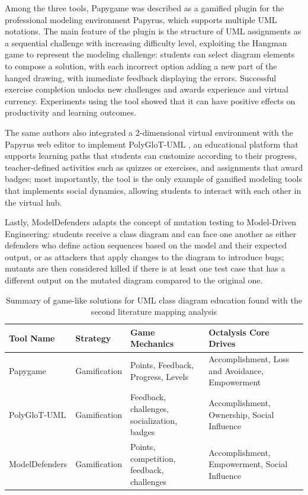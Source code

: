 {Among the three tools, Papygame \cite{bucchiarone2020papyrus, bucchiarone2023gamifying} was described as a gamified plugin for the professional modeling environment Papyrus, which supports multiple UML notations. The main feature of the plugin is the structure of UML assignments as a sequential challenge with increasing difficulty level, exploiting the Hangman game to represent the modeling challenge: students can select diagram elements to compose a solution, with each incorrect option adding a new part of the hanged drawing, with immediate feedback displaying the errors. Successful exercise completion unlocks new challenges and awards experience and virtual currency. Experiments using the tool showed that it can have positive effects on productivity and learning outcomes.

The same authors also integrated a 2-dimensional virtual environment with the Papyrus web editor to implement PolyGloT-UML \cite{bucchiarone2024polyglot}, an educational platform that supports learning paths that students can customize according to their progress, teacher-defined activities such as quizzes or exercises, and assignments that award badges; most importantly, the tool is the only example of gamified modeling tools that implements social dynamics, allowing students to interact with each other in the virtual hub. 

Lastly, ModelDefenders \cite{cammaerts2023modeldefenders, cammaerts2024towards} adapts the concept of mutation testing to Model-Driven Engineering: students receive a class diagram and can face one another as either defenders who define action sequences based on the model and their expected output, or as attackers that apply changes to the diagram to introduce bugs; mutants are then considered killed if there is at least one test case that has a different output on the mutated diagram compared to the original one.

{\begin{table}[ht]
\centering
\footnotesize
\begin{tabular}{@{}p{3cm}p{2.5cm}p{4cm}p{4cm}@{}}
\toprule
\textbf{Tool Name} & \textbf{Strategy} & \textbf{Game Mechanics} & \textbf{Octalysis Core Drives} \\
\midrule
Papygame \cite{bucchiarone2020papyrus, bucchiarone2023gamifying} & Gamification & Points, Feedback, Progress, Levels & Accomplishment, Loss and Avoidance, Empowerment \\ 
PolyGloT-UML \cite{bucchiarone2024polyglot} & Gamification & Feedback, challenges, socialization, badges & Accomplishment, Ownership, Social Influence \\ 
ModelDefenders \cite{cammaerts2023modeldefenders, cammaerts2024towards} & Gamification & Points, competition, feedback, challenges & Accomplishment, Empowerment, Social Influence \\
\bottomrule
\end{tabular}
\caption{Summary of game-like solutions for UML class diagram education found with the second literature mapping analysis}
\label{tab:mapping2}
\end{table}

}}
